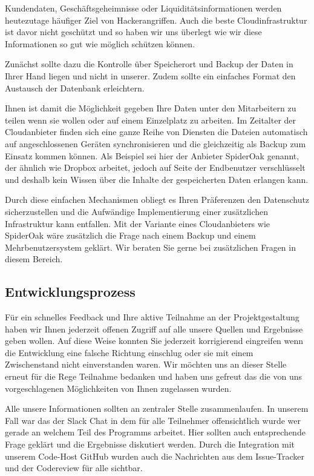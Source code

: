 \documentclass[12pt]{article}
\begin{document}
Kundendaten, Geschäftsgeheimnisse oder Liquiditätsinformationen werden heutezutage häufiger Ziel von Hackerangriffen. Auch die beste Cloudinfrastruktur ist davor nicht geschützt und so haben wir uns überlegt wie wir diese Informationen so gut wie möglich schützen können.
\newline

Zunächst sollte dazu die Kontrolle über Speicherort und Backup der Daten in Ihrer Hand liegen und nicht in unserer. Zudem sollte ein einfaches Format den Austausch der Datenbank erleichtern.
\newline

Ihnen ist damit die Möglichkeit gegeben Ihre Daten unter den Mitarbeitern zu teilen wenn sie wollen oder auf einem Einzelplatz zu arbeiten. Im Zeitalter der Cloudanbieter finden sich eine ganze Reihe von Diensten die Dateien automatisch auf angeschlossenen Geräten synchronisieren und die gleichzeitig als Backup zum Einsatz kommen können. Als Beispiel sei hier der Anbieter SpiderOak genannt, der ähnlich wie Dropbox arbeitet, jedoch auf Seite der Endbenutzer verschlüsselt und deshalb kein Wissen über die Inhalte der gespeicherten Daten erlangen kann.
\newline 

Durch diese einfachen Mechanismen obliegt es Ihren Präferenzen den Datenschutz sicherzustellen und die Aufwändige Implementierung einer zusätzlichen Infrastruktur kann entfallen. Mit der Variante eines Cloudanbieters wie SpiderOak wäre zusätzlich die Frage nach einem Backup und einem Mehrbenutzersystem geklärt. Wir beraten Sie gerne bei zusätzlichen Fragen in diesem Bereich.

\subsection{Entwicklungsprozess}

Für ein schnelles Feedback und Ihre aktive Teilnahme an der Projektgestaltung haben wir Ihnen jederzeit offenen Zugriff auf alle unsere Quellen und Ergebnisse geben wollen. Auf diese Weise konnten Sie jederzeit korrigierend eingreifen wenn die Entwicklung eine falsche Richtung einschlug oder sie mit einem Zwischenstand nicht einverstanden waren. Wir möchten uns an dieser Stelle erneut für die Rege Teilnahme bedanken und haben uns gefreut das die von uns vorgeschlagenen Möglichkeiten von Ihnen zugelassen wurden. 
\newline

Alle unsere Informationen sollten an zentraler Stelle zusammenlaufen. In unserem Fall war das der Slack Chat in dem für alle Teilnehmer offensichtlich wurde wer gerade an welchem Teil des Programms arbeitet. Hier sollten auch entsprechende Frage geklärt und die Ergebnisse diskutiert werden. Durch die Integration mit unserem Code-Host GitHub wurden auch die Nachrichten aus dem Issue-Tracker und der Codereview für alle sichtbar.
\newline
\end{document}

